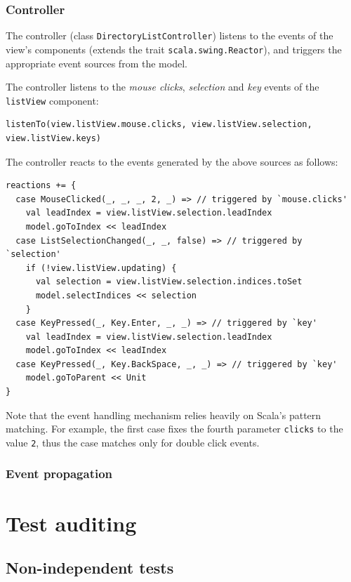 \subsubsection{Controller}

The controller (class \texttt{DirectoryListController}) listens to the events of the view's components (extends the trait \texttt{scala.swing.Reactor}), and triggers the appropriate event sources from the model. 

The controller listens to the \emph{mouse clicks}, \emph{selection} and \emph{key} events of the \texttt{listView} component:
\begin{lstlisting}
listenTo(view.listView.mouse.clicks, view.listView.selection, view.listView.keys)
\end{lstlisting}


The controller reacts to the events generated by the above sources as follows:
\begin{lstlisting}
reactions += {
  case MouseClicked(_, _, _, 2, _) => // triggered by `mouse.clicks'
    val leadIndex = view.listView.selection.leadIndex
    model.goToIndex << leadIndex
  case ListSelectionChanged(_, _, false) => // triggered by `selection'
    if (!view.listView.updating) {
      val selection = view.listView.selection.indices.toSet
      model.selectIndices << selection
    }
  case KeyPressed(_, Key.Enter, _, _) => // triggered by `key'
    val leadIndex = view.listView.selection.leadIndex
    model.goToIndex << leadIndex
  case KeyPressed(_, Key.BackSpace, _, _) => // triggered by `key'
    model.goToParent << Unit
}
\end{lstlisting}

Note that the event handling mechanism relies heavily on Scala's pattern matching. For example, the first case fixes the fourth parameter \texttt{clicks} to the value \texttt{2}, thus the case matches only for double click events. 

\subsubsection{Event propagation}



\section{Test auditing}\label{sec:test-auditing}

\subsection {Non-independent tests}

